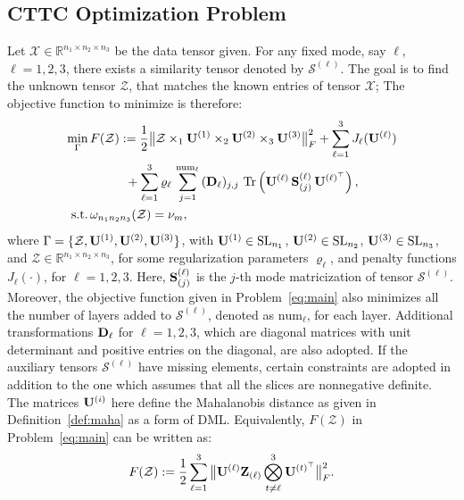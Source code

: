 \documentclass{article}
\newcommand{\R}{{\mathbb R}}
\newcommand{\SL}{\operatorname{SL}}
\newcommand{\Trace}{\operatorname{Tr}}
\newcommand{\T}{\mathcal}
\newcommand{\m}[1]{{\bf{#1}}}
\newcommand{\mb}[1]{{\mathbb{#1}}}
\begin{document}
\subsection{CTTC Optimization Problem}\label{subsec:cttco}
Let $\T X\in \mb R^{n_1\times n_2\times n_3}$ be the data tensor given. For any fixed mode, say $\ell$, $\ell=1,2,3$, there exists a similarity tensor denoted by $\T S^{(\ell)}$. The goal is to find the unknown tensor $\T Z$, that matches the known entries of tensor $\T X$; The objective function to minimize is therefore:
\begin{equation}\label{eq:main}
\begin{aligned}
\min\limits_{\Gamma}  & \, 
F(\T Z):=\frac12\big{\|}\T Z \times_1 \m U^{(1)}\times_2 \m U^{(2)}\times_3   \m U^{(3)}\big{\|}_F^2
+\sum\limits_{\ell=1}^3 J_\ell(\m U^{(\ell)})\\ \quad  &
\qquad\quad+\sum\limits_{\ell=1}^3 \varrho_\ell\,  \sum\limits_{j=1}^{\text{num}_\ell}\,  (\m D_\ell)_{j,j}\,
\Trace\left (\m U^{(\ell)}\, \m S^{(\ell)}_{(j)}\, \m U^{{(\ell)^\top}}\right ), \\
\textrm{s.t.}  & \, \omega_{n_1n_2n_3}(\T Z)=\nu_{m}, 
\end{aligned}
\end{equation}
where $\Gamma=\{\T Z,\m U^{(1)}, \m U^{(2)}, \m U^{(3)}\}$, with $\m U^{(1)}\in \SL_{n_1}$, $\m U^{(2)}\in \SL_{n_2}$, $\m U^{(3)}\in \SL_{n_3}$, and $\T Z\in \R^{n_1\times n_2\times n_3}$, for some regularization parameters $\varrho_\ell$, and penalty functions $J_\ell(\cdot)$, for $\ell=1,2,3$. Here, $\m S^{(\ell)}_{(j)}$ is the $j$-th mode matricization of tensor $\T S^{(\ell)}$. Moreover, the objective function given in Problem~\eqref{eq:main} also minimizes all the number of layers added to $\T S^{(\ell)}$, denoted as $\text{num}_\ell$, for each layer.  Additional transformations $\m D_\ell$ for $\ell=1,2,3$, which are diagonal matrices with unit determinant and positive entries on the diagonal, are also adopted. If the auxiliary tensors $\T S^{(\ell)}$ have missing elements, certain constraints are adopted in addition to the one which assumes that all 
the slices are nonnegative definite. The matrices $\m U^{(i)}$ here define the Mahalanobis distance as given in Definition~\ref{def:maha} as a form of DML. Equivalently, $F(\T Z)$ in Problem~\ref{eq:main} can be written as:  
\begin{equation}\label{eq:main:alt}
	F(\T Z):=\frac12\sum\limits_{\ell=1}^3\big{\|}\m U^{(\ell)}\m Z_{(\ell)} \bigotimes\limits_{t\neq \ell}^3\m U^{(t)^\top}\big{\|}_F^2.
\end{equation}
\end{document}
